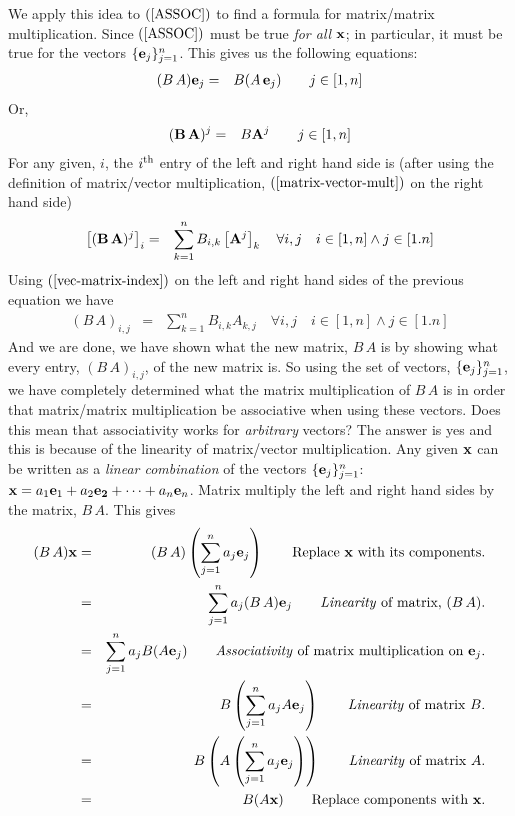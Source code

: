 \documentclass{article}
\begin{document}
We apply this idea to $(\ref{ASSOC})$ to find a formula for matrix/matrix multiplication.
Since $(\ref{ASSOC})$ must be true {\em for all\/} ${\bf x}$; in particular, it must be
true for the vectors $\{{\bf e}_j\}_{j=1}^n$.
This gives us the following equations:
\begin{eqnarray}
	(B \, A) {\bf e}_j & = & B (A \, {\bf e}_j) \quad\quad \text{$j \in [1,n]$} 
\end{eqnarray}
Or,
\begin{eqnarray}
	({\bf B} \, {\bf A})^j & = & B  {\bf A}^j \quad\quad \text{$j \in [1, n]$}
\end{eqnarray}
For any given, $i$, the $i^{\rm th}$ entry of the left and right hand side is
(after using the definition of matrix/vector multiplication, $(\ref{matrix-vector-mult})$ on the right hand side)
\begin{eqnarray}
	\left[({\bf B} \, {\bf A})^j\right]_i & = & \sum_{k=1}^n B_{i,k}  \left[{\bf A}^j\right]_k  \quad \forall i,j \quad i \in [1, n] \wedge j \in [1.n]
\end{eqnarray}
Using $(\ref{vec-matrix-index})$ on the left and right hand sides of the previous equation we have
\begin{eqnarray}
	(B \, A)_{i, j} & = & \sum_{k=1}^n B_{i, k}  A_{k, j}  \quad \forall i,j \quad i \in [1, n] \wedge j \in [1.n] \label{matrix-matrix-mult}
\end{eqnarray}
And we are done, we have shown what the new matrix, $B \, A$ is by showing what every entry, $(B\, A)_{i, j}$, of
the new matrix is.
So using the set of vectors, $\{{\bf e}_j\}_{j=1}^n$, we have completely determined what 
the matrix multiplication of $B \, A$ is in order that matrix/matrix multiplication be 
associative when using these vectors. Does this mean that associativity works for 
{\em arbitrary\/} vectors? The answer is yes and this is because of the linearity of
matrix/vector multiplication. Any given ${\bf x}$ can be written as a {\em linear combination\/}
of the vectors $\{{\bf e}_j\}_{j=1}^n$: ${\bf x} = a_1 {\bf e}_1 + a_2 {\bf e_2} + \cdots + a_n {\bf e}_n$.
Matrix multiply the left and right hand sides by the matrix, $B\,A$. This gives
\begin{eqnarray}
	(B\, A){\bf x} & = & (B \, A)\left(\sum_{j=1}^n a_j {\bf e}_j\right) \quad\quad \text{Replace ${\bf x}$ with its components.}\nonumber \\
				   & = &\sum_{j=1}^n a_j (B \, A){\bf e}_j \quad\quad \text{{\em Linearity\/} of matrix, $(B \, A)$.}\nonumber \\
				   & = &\sum_{j=1}^n a_j B (A{\bf e}_j) \quad\quad \text{{\em Associativity\/} of matrix multiplication on ${\bf e}_j$.}\nonumber \\
				   & = &B\left(\sum_{j=1}^n a_j A{\bf e}_j\right) \quad\quad \text{{\em Linearity\/} of matrix $B$.}\nonumber \\
				   & = &B\left( A\left(\sum_{j=1}^n a_j {\bf e}_j\right)\right) \quad\quad \text{{\em Linearity\/} of matrix $A$.}\nonumber \\
				   & = &B( A {\bf x}) \quad\quad \text{Replace components with ${\bf x}$.}
\end{eqnarray}
\end{document}
